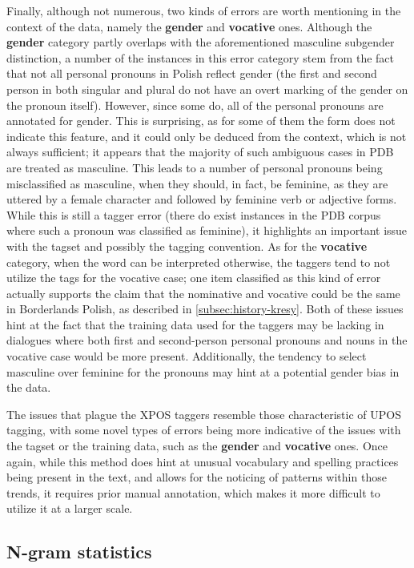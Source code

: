 Finally, although not numerous, two kinds of errors are worth mentioning in the context of the data, namely the \textbf{gender} and \textbf{vocative} ones. Although the \textbf{gender} category partly overlaps with the aforementioned masculine subgender distinction, a number of the instances in this error category stem from the fact that not all personal pronouns in Polish reflect gender (the first and second person in both singular and plural do not have an overt marking of the gender on the pronoun itself). However, since some do, all of the personal pronouns are annotated for gender. This is surprising, as for some of them the form does not indicate this feature, and it could only be deduced from the context, which is not always sufficient; it appears that the majority of such ambiguous cases in PDB are treated as masculine. This leads to a number of personal pronouns being misclassified as masculine, when they should, in fact, be feminine, as they are uttered by a female character and followed by feminine verb or adjective forms. While this is still a tagger error (there do exist instances in the PDB corpus where such a pronoun was classified as feminine), it highlights an important issue with the tagset and possibly the tagging convention. As for the \textbf{vocative} category, when the word can be interpreted otherwise, the taggers tend to not utilize the tags for the vocative case; one item classified as this kind of error actually supports the claim that the nominative and vocative could be the same in Borderlands Polish, as described in \autoref{subsec:history-kresy}. Both of these issues hint at the fact that the training data used for the taggers may be lacking in dialogues where both first and second-person personal pronouns and nouns in the vocative case would be more present. Additionally, the tendency to select masculine over feminine for the pronouns may hint at a potential gender bias in the data.

The issues that plague the XPOS taggers resemble those characteristic of UPOS tagging, with some novel types of errors being more indicative of the issues with the tagset or the training data, such as the \textbf{gender} and \textbf{vocative} ones. Once again, while this method does hint at unusual vocabulary and spelling practices being present in the text, and allows for the noticing of patterns within those trends, it requires prior manual annotation, which makes it more difficult to utilize it at a larger scale. 

\subsection{N-gram statistics}
\label{subsec:ngram-stats-results}

